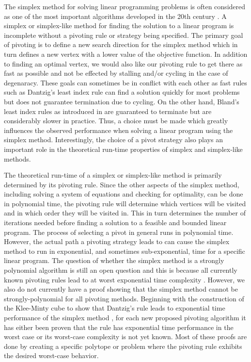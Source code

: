\documentclass{standalone}
\begin{document}
The simplex method for solving linear programming problems is often considered as one of the most important algorithms developed in the 20th century \cite{cipra2000best}. A simplex or simplex-like method for finding the solution to a linear program is incomplete without a pivoting rule or strategy being specified. The primary goal of pivoting is to define a new search direction for the simplex method which in turn defines a new vertex with a lower value of the objective function. In addition to finding an optimal vertex, we would also like our pivoting rule to get there as fast as possible and not be effected by stalling and/or cycling in the case of degenaracy. These goals can sometimes be in conflict with each other as fast rules such as Dantzig's least index rule can find a solution quickly for most problems but does not guarantee termination due to cycling. On the other hand, Bland's least index rules as introduced in \cite{bland1977new} are guaranteed to terminate but are considerably slower in practice. Thus, a choice must be made which greatly influences the observed performance when solving a linear program using the simplex method. Interestingly, the choice of a pivot strategy also plays an important role in the theoretical run-time properties of simplex and simplex-like methods.\par 
The theoretical run-time of a simplex or simplex-like method is primarily determined by its pivoting rule. Since the other aspects of the simplex method, including solving a system of equations and checking for optimality, can be done in polynomial time, the pivoting rule will determine which vertices will be visited and in which order they will be visited in. This in turn determines the number of iterations needed before finding a solution to a feasible and bounded linear program. The process of selecting a pivot in general runs in polynomial time. However, the actual path a pivoting strategy leads to can cause the simplex method to run in exponential, and sometimes sub-exponential, time for a specific linear program. The question of whether the simplex method is a strongly polynomial algorithm is still an open question and this is because all currently known pivoting rules lead to at worst exponential time complexity \cite{adler2014simplex}. However, we also do not currently have a proof showing that the simplex method cannot be strongly-polynomial for all pivoting methods. Beginning with the construction of the Klee-Minty cube to show that Dantzig's rule leads to exponential time performance of the simplex method \cite{klee1972good}, for each new proposed pivoting algorithm it has either been proven that the rule has exponential time performance in the worst case or its worst-case complexity is not yet known. Most of these proofs are done by creating a specific polytope or problem where the pivoting rule exhibits the desired worst-case behavior.\par
\end{document}
